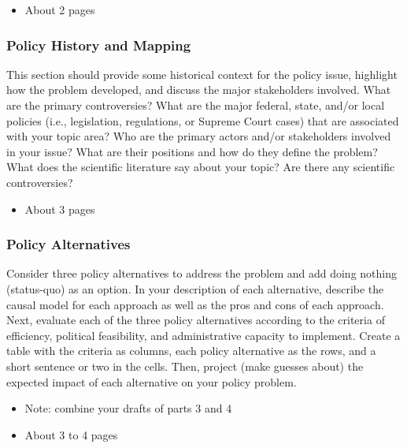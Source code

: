 \begin{itemize}
\item About 2 pages
\end{itemize}

\hypertarget{issue-analysis}{%
\subsubsection{Policy History and Mapping}\label{issue-analysis}}

This section should provide some historical context for the policy
issue, highlight how the problem developed, and discuss the major
stakeholders involved. What are the primary controversies? What are the
major federal, state, and/or local policies (i.e., legislation,
regulations, or Supreme Court cases) that are associated with your topic
area? Who are the primary actors and/or stakeholders involved in your
issue? What are their positions and how do they define the problem? What
does the scientific literature say about your topic? Are there any
scientific controversies?

\begin{itemize}
\item
  About 3 pages
\end{itemize}

\hypertarget{policy-alternatives}{%
\subsubsection{Policy Alternatives}\label{policy-alternatives}}

Consider three policy alternatives to address the problem and add doing
nothing (status-quo) as an option. In your description of each
alternative, describe the causal model for each approach as well as the
pros and cons of each approach. Next, evaluate each of the three policy
alternatives according to the criteria of efficiency, political
feasibility, and administrative capacity to implement. Create a table with the criteria as columns, each policy alternative as the rows, and a short sentence or two in the cells. Then, project
(make guesses about) the expected impact of each alternative on your
policy problem.

\begin{itemize}
\item
  Note: combine your drafts of parts 3 and 4 
\item
  About 3 to 4 pages
\end{itemize}

